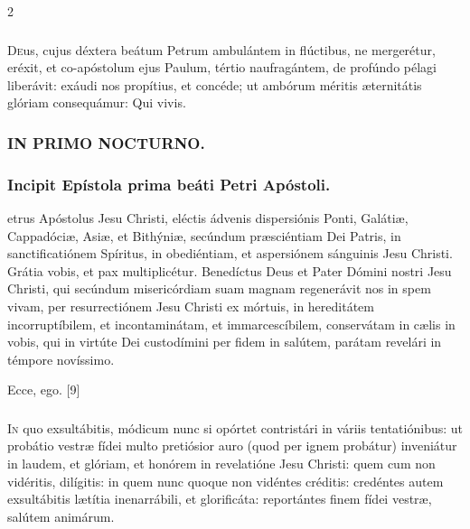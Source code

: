 \documentclass[9pt,twoside]{extarticle}
\begin{document}
\begin{multicols}{2}
\subsubsection*{\center {}}
\lettrine{D}eus, cujus déxtera beátum Petrum ambulántem in flúctibus, ne mergerétur, eréxit, et co-apóstolum ejus Paulum, tértio naufragántem, de profúndo pélagi liberávit: exáudi nos propítius, et concéde; ut ambórum méritis æternitátis glóriam consequámur: Qui vivis.

\subsubsection*{\center \textsc{IN PRIMO NOCTURNO.}}
\begin{tightlist}{}
\item {}
\item {}
\end{tightlist}

\subsubsection*{\center Incipit Epístola prima beáti Petri Apóstoli.}
\begin{center}\end{center}
etrus Apóstolus Jesu Christi, eléctis ádvenis dispersiónis Ponti, Galátiæ, Cappadóciæ, Asiæ, et Bithýniæ,
secúndum præsciéntiam Dei Patris, in sanctificatiónem Spíritus, in obediéntiam, et aspersiónem sánguinis Jesu Christi. Grátia vobis, et pax multiplicétur.
Benedíctus Deus et Pater Dómini nostri Jesu Christi, qui secúndum misericórdiam suam magnam regenerávit nos in spem vivam, per resurrectiónem Jesu Christi ex mórtuis,
in hereditátem incorruptíbilem, et incontaminátam, et immarcescíbilem, conservátam in cælis in vobis,
qui in virtúte Dei custodímini per fidem in salútem, parátam revelári in témpore novíssimo.

\begin{tightlist}{}
\item {} Ecce, ego. [9]
\end{tightlist}

\subsubsection*{\center {}}
\lettrine{I}n quo exsultábitis, módicum nunc si opórtet contristári in váriis tentatiónibus:
ut probátio vestræ fídei multo pretiósior auro (quod per ignem probátur) inveniátur in laudem, et glóriam, et honórem in revelatióne Jesu Christi:
quem cum non vidéritis, dilígitis: in quem nunc quoque non vidéntes créditis: credéntes autem exsultábitis lætítia inenarrábili, et glorificáta:
reportántes finem fídei vestræ, salútem animárum.


\end{multicols}
\end{document}
